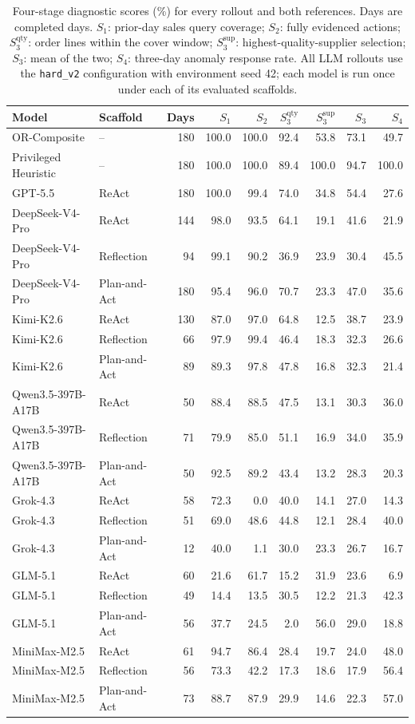 \begin{table}[t]
\centering
\small
\begin{tabular}{llrrrrrrr}
\toprule
Model & Scaffold & Days & $S_1$ & $S_2$ & $S_3^{\mathrm{qty}}$ & $S_3^{\mathrm{sup}}$ & $S_3$ & $S_4$ \\
\midrule
OR-Composite & -- & 180 & 100.0 & 100.0 & 92.4 & 53.8 & 73.1 & 49.7 \\
Privileged Heuristic & -- & 180 & 100.0 & 100.0 & 89.4 & 100.0 & 94.7 & 100.0 \\
\midrule
GPT-5.5 & ReAct & 180 & 100.0 & 99.4 & 74.0 & 34.8 & 54.4 & 27.6 \\
DeepSeek-V4-Pro & ReAct & 144 & 98.0 & 93.5 & 64.1 & 19.1 & 41.6 & 21.9 \\
DeepSeek-V4-Pro & Reflection & 94 & 99.1 & 90.2 & 36.9 & 23.9 & 30.4 & 45.5 \\
DeepSeek-V4-Pro & Plan-and-Act & 180 & 95.4 & 96.0 & 70.7 & 23.3 & 47.0 & 35.6 \\
Kimi-K2.6 & ReAct & 130 & 87.0 & 97.0 & 64.8 & 12.5 & 38.7 & 23.9 \\
Kimi-K2.6 & Reflection & 66 & 97.9 & 99.4 & 46.4 & 18.3 & 32.3 & 26.6 \\
Kimi-K2.6 & Plan-and-Act & 89 & 89.3 & 97.8 & 47.8 & 16.8 & 32.3 & 21.4 \\
Qwen3.5-397B-A17B & ReAct & 50 & 88.4 & 88.5 & 47.5 & 13.1 & 30.3 & 36.0 \\
Qwen3.5-397B-A17B & Reflection & 71 & 79.9 & 85.0 & 51.1 & 16.9 & 34.0 & 35.9 \\
Qwen3.5-397B-A17B & Plan-and-Act & 50 & 92.5 & 89.2 & 43.4 & 13.2 & 28.3 & 20.3 \\
Grok-4.3 & ReAct & 58 & 72.3 & 0.0 & 40.0 & 14.1 & 27.0 & 14.3 \\
Grok-4.3 & Reflection & 51 & 69.0 & 48.6 & 44.8 & 12.1 & 28.4 & 40.0 \\
Grok-4.3 & Plan-and-Act & 12 & 40.0 & 1.1 & 30.0 & 23.3 & 26.7 & 16.7 \\
GLM-5.1 & ReAct & 60 & 21.6 & 61.7 & 15.2 & 31.9 & 23.6 & 6.9 \\
GLM-5.1 & Reflection & 49 & 14.4 & 13.5 & 30.5 & 12.2 & 21.3 & 42.3 \\
GLM-5.1 & Plan-and-Act & 56 & 37.7 & 24.5 & 2.0 & 56.0 & 29.0 & 18.8 \\
MiniMax-M2.5 & ReAct & 61 & 94.7 & 86.4 & 28.4 & 19.7 & 24.0 & 48.0 \\
MiniMax-M2.5 & Reflection & 56 & 73.3 & 42.2 & 17.3 & 18.6 & 17.9 & 56.4 \\
MiniMax-M2.5 & Plan-and-Act & 73 & 88.7 & 87.9 & 29.9 & 14.6 & 22.3 & 57.0 \\
\bottomrule
\end{tabular}
\caption{Four-stage diagnostic scores (\%) for every rollout and both references. Days are completed days. $S_1$: prior-day sales query coverage; $S_2$: fully evidenced actions; $S_3^{\mathrm{qty}}$: order lines within the cover window; $S_3^{\mathrm{sup}}$: highest-quality-supplier selection; $S_3$: mean of the two; $S_4$: three-day anomaly response rate. All LLM rollouts use the \texttt{hard\_v2} configuration with environment seed 42; each model is run once under each of its evaluated scaffolds.}
\label{tab:four_stage_runs}
\end{table}
